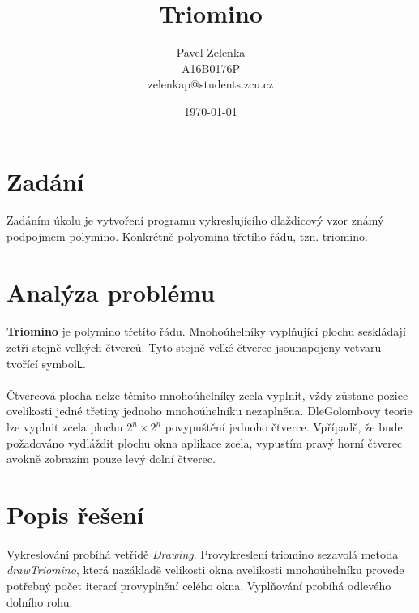\documentclass[12pt]{scrartcl}
\author{Pavel Zelenka\\A16B0176P\\zelenkap@students.zcu.cz}
\date{\today}
\title{Triomino}
\begin{document}
\maketitle
{}
\newpage
{}
\newpage
\section{Zadání}
	
\paragraph{}
Zadáním úkolu je vytvoření programu vykreslujícího dlaždicový vzor známý pod\nobreakspace pojmem polymino. Konkrétně polyomina třetího řádu, tzn. triomino.


\section{Analýza problému}

\paragraph{}
\textbf{Triomino} je polymino třetíto řádu. Mnohoúhelníky vyplňující plochu se\nobreakspace skládají ze\nobreakspace tří stejně velkých čtverců. Tyto stejně velké čtverce jsou\nobreakspace napojeny ve\nobreakspace tvaru tvořící symbol\nobreakspace \texttt{L}.

\paragraph{}
Čtvercová plocha nelze těmito mnohoúhelníky zcela vyplnit, vždy zůstane pozice o\nobreakspace velikosti jedné třetiny jednoho mnohoúhelníku nezaplněna. Dle\nobreakspace Golombovy teorie lze vyplnit zcela plochu $2^n \times 2^n$ po\nobreakspace vypuštění jednoho čtverce. V\nobreakspace případě, že bude požadováno vydláždit plochu okna aplikace zcela, vypustím pravý horní čtverec a\nobreakspace v\nobreakspace okně zobrazím pouze levý dolní čtverec.

\section{Popis řešení}

\paragraph{}
Vykreslování probíhá ve\nobreakspace třídě \emph{Drawing}. Pro\nobreakspace vykreslení triomino se\nobreakspace zavolá metoda \emph{\mbox{drawTriomino}}, která na\nobreakspace základě velikosti okna a\nobreakspace velikosti mnohoúhelníku provede potřebný počet iterací pro\nobreakspace vyplnění celého okna. Vyplňování probíhá od\nobreakspace levého dolního rohu.
\end{document}
